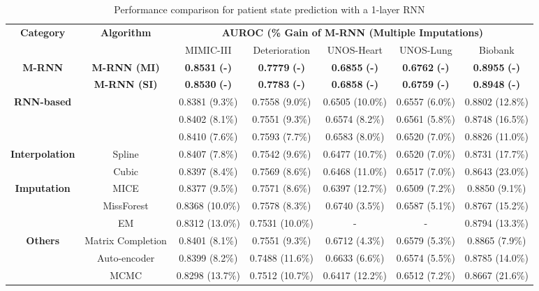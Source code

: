 \documentclass{article}
\begin{document}
\begin{table*}[t!]
	\caption{Performance comparison for patient state prediction with a 1-layer RNN}
	\label{tab:Prediction}
	\centering
	\small
	\begin{tabular}{c|c|c|c|c|c|c}
		\toprule
		\multirow{2}{*}{\textbf{Category}}&\multirow{2}{*}{\textbf{Algorithm}}&\multicolumn{5}{c}{\textbf{AUROC (\% Gain of M-RNN (Multiple Imputations)}}  \\
		\cmidrule{3-7}
		& & MIMIC-III & Deterioration & UNOS-Heart & UNOS-Lung & Biobank \\
		\midrule
		\multirow{2}{*}{\textbf{M-RNN}}&\textbf{M-RNN (MI)} &  \textbf{0.8531}  \textbf{(-)}  &\textbf{0.7779}  \textbf{(-)} &\textbf{0.6855}  \textbf{(-)}&\textbf{0.6762}  \textbf{(-)} &\textbf{0.8955}  \textbf{(-)}  \\
		&\textbf{M-RNN (SI)} &  \textbf{0.8530}  \textbf{(-)}  & \textbf{0.7783}  \textbf{(-)} &\textbf{0.6858}  \textbf{(-)}&\textbf{0.6759}  \textbf{(-)}&\textbf{0.8948}  \textbf{(-)}  \\
		\midrule
		\multirow{3}{*}{\textbf{RNN-based}}&\cite{Recent_RNN1} & 0.8381  (9.3\%)& 0.7558  (9.0\%)  &0.6505 (10.0\%) &0.6557 (6.0\%)&0.8802 (12.8\%)\\
		&\cite{Recent_RNN2}   & 0.8402  (8.1\%)&0.7551  (9.3\%)&0.6574 (8.2\%)  &0.6561 (5.8\%)&0.8748 (16.5\%)\\
		&\cite{Recent_RNN3}   & 0.8410  (7.6\%)&0.7593  (7.7\%)&0.6583 (8.0\%)  &0.6520  (7.0\%)&0.8826 (11.0\%)\\
		\midrule
		\multirow{2}{*}{\textbf{Interpolation}} & Spline &  0.8407 (7.8\%)& 0.7542  (9.6\%)&0.6477 (10.7\%)&0.6520 (7.0\%) &0.8731 (17.7\%)\\
		& Cubic   & 0.8397 (8.4\%)&0.7569 (8.6\%)&0.6468 (11.0\%)&0.6517  (7.0\%)&0.8643  (23.0\%)\\
		\midrule
		\multirow{3}{*}{\textbf{Imputation}} & MICE & 0.8377 (9.5\%)  &0.7571 (8.6\%)&0.6397 (12.7\%) &0.6509 (7.2\%)&0.8850  (9.1\%) \\
		&MissForest & 0.8368 (10.0\%)  & 0.7578 (8.3\%) &0.6740 (3.5\%)& 0.6587 (5.1\%)&0.8767 (15.2\%)\\		
		&EM   &  0.8312 (13.0\%)&0.7531 (10.0\%)& -& -&0.8794  (13.3\%) \\ 
		\midrule
		\multirow{3}{*}{\textbf{Others}}&Matrix Completion   &  0.8401 (8.1\%)&0.7551 (9.3\%)&0.6712 (4.3\%)& 0.6579 (5.3\%)&0.8865  (7.9\%) \\
		& Auto-encoder   & 0.8399 (8.2\%) &0.7488 (11.6\%)&0.6633 (6.6\%) &0.6574 (5.5\%) &0.8785 (14.0\%) \\
		& MCMC   & 0.8298 (13.7\%) &0.7512 (10.7\%)&0.6417 (12.2\%) &0.6512 (7.2\%)&0.8667 (21.6\%)  \\
		\bottomrule
	\end{tabular}
\end{table*}
\end{document}
